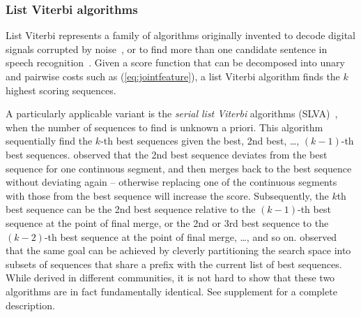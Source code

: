 

\subsubsection{List Viterbi algorithms}
List Viterbi represents a family of algorithms originally invented to decode digital signals corrupted by noise~\cite{seshadri1994list}, or to find more than one candidate sentence in speech recognition~\cite{soong1991tree}. Given a score function that can be decomposed into unary and pairwise costs such as (\ref{eq:jointfeature}), a list Viterbi algorithm finds the $k$ highest scoring sequences. %

A particularly applicable variant is the \emph{serial list Viterbi} algorithms (SLVA)~\cite{seshadri1994list,nilsson2001sequentially}, when the number of sequences to find is unknown a priori. 
This algorithm sequentially find the $k$-th best sequences given the best, 2nd best, \dots, $(k \!-\! 1)$-th best sequences.
\citet{seshadri1994list} observed 
that the 2nd best sequence deviates from the best sequence
for one continuous segment, and then merges back to the best sequence without deviating again
-- otherwise replacing one of the continuous segments with those from the best sequence will increase the score.
Subsequently, the $k$th best sequence can be the 2nd best sequence relative to the $(k \!-\! 1)$-th best sequence
at the point of final merge, or the 2nd or 3rd best sequence to the $(k \!-\! 2)$-th best sequence at the point of final merge, \ldots, and so on. 
\citet{nilsson2001sequentially} observed that the same goal can be achieved by cleverly partitioning the search space into subsets of sequences that share a prefix with the current list of best sequences. While derived in different communities, it is not hard to show that these two algorithms are in fact fundamentally identical.
See supplement for a complete description.

